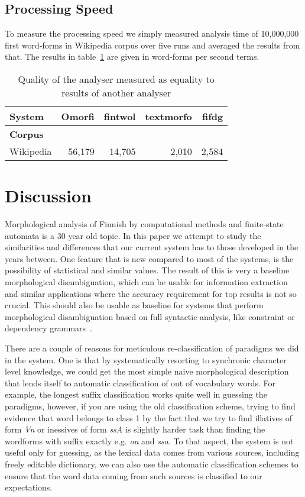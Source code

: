 \documentclass[a4paper,12pt]{article}
\begin{document}
\subsection{Processing Speed}

To measure the processing speed we simply measured analysis time of 10,000,000
first word-forms in Wikipedia corpus over five runs and averaged the results
from that. The results in table~\ref{table:speed} are given in word-forms per
second terms.

\begin{table}
    \centering
    \begin{tabular}{|l|r|r|r|r|}
        \hline
        \bf System & Omorfi & fintwol & textmorfo & fifdg \\
        \hline
        \bf Corpus &        &         &           & \\
        \hline
        Wikipedia & 56,179  & 14,705  & 2,010 & 2,584 \\
        \hline
    \end{tabular}
    \caption{Quality of the analyser measured as equality to results of
        another analyser \label{table:speed}}
\end{table}

\section{Discussion}

Morphological analysis of Finnish by computational methods and finite-state
automata is a 30 year old topic. In this paper we attempt to study the
similarities and differences that our current system has to those developed in
the years between. One feature that is new compared to most of the systems, is
the possibility of statistical and similar values. The result of this is very a
baseline morphological disambiguation, which can be usable for information
extraction and similar applications where the accuracy requirement for top
results is not so crucial. This should also be usable as baseline for systems
that perform morphological disambiguation based on full syntactic analysis,
like constraint or dependency grammars~\cite{karlsson}.

There are a couple of reasons for meticulous re-classification of paradigms
we did in the system. One is that by systematically resorting to synchronic
character level knowledge, we could get the most simple naive morphological
description that lends itself to automatic classification of out of vocabulary
words. For example, the longest suffix classification works quite well in
guessing the paradigms, however, if you are using the old classification
scheme, trying to find evidence that word belongs to class 1 by the fact that
we try to find illatives of form \emph{Vn} or inessives of form \emph{ssA} is
slightly harder task than finding the wordforms with suffix exactly e.g.
\emph{on} and \emph{ssa}. To that aspect, the system is not useful only
for guessing, as the lexical data comes from various sources, including
freely editable dictionary, we can also use the automatic classification
schemes to ensure that the word data coming from such sources is classified to
our expectations.
\end{document}
